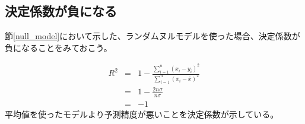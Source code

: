 \subsection{決定係数が負になる}
節\ref{null_model}において示した、ランダムヌルモデルを使った場合、決定係数が負になることをみておこう。

\begin{eqnarray*}
 R^2 &=& 1-\frac{\sum_{i=1}^n (x_i-y_i)^2}{\sum_{i=1}^n (x_i-\bar{x})^2}\\
 &=& 1-\frac{2n\sigma}{n\sigma}\\
 &=& -1
\end{eqnarray*}
平均値を使ったモデルより予測精度が悪いことを決定係数が示している。


